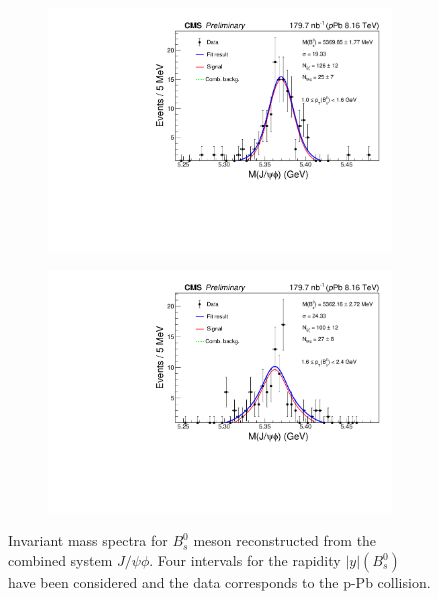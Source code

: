 \begin{figure}[htp!]
\begin{subfigure}[b]{0.475\textwidth}
		\includegraphics[width=\textwidth]{MainContent/Figs/mass/mass_BsFit_ybins_1.0_1.6.PDF}
		\caption{}
	\end{subfigure}
	\hfill
	\begin{subfigure}[b]{0.475\textwidth}
		\centering
		\includegraphics[width=\textwidth]{MainContent/Figs/mass/mass_BsFit_ybins_1.6_2.4.PDF}
		\caption{}%
	\end{subfigure}
	\caption{Invariant mass spectra for $B^0_s$ meson reconstructed from the combined system $J/\psi \phi$. Four intervals for the rapidity $|y|(B^0_s)$ have been considered and the data corresponds to the p-Pb collision.}
	\label{fig:mass_ybins}
	
\end{figure}

